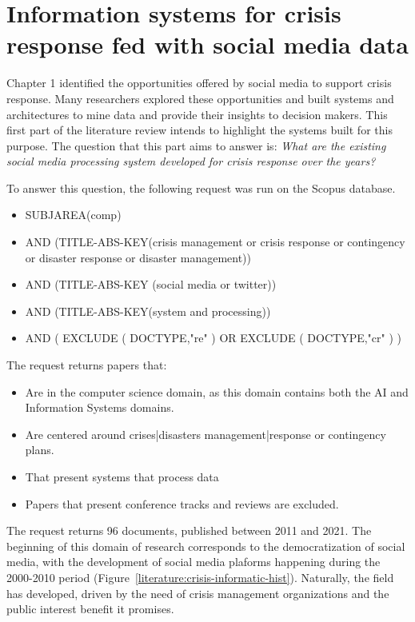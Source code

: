\section{Information systems for crisis response fed with social media data}
Chapter 1 identified the opportunities offered by social media to support crisis response.
Many researchers explored these opportunities and built systems and architectures to mine data and provide their insights to decision makers.
This first part of the literature review intends to highlight the systems built for this purpose.
The question that this part aims to answer is: \emph{What are the existing social media processing system developed for crisis response over the years?}

To answer this question, the following request was run on the Scopus database.

\begin{itemize}
    \item SUBJAREA(comp)
    \item AND (TITLE-ABS-KEY({crisis management} or {crisis response} or contingency or {disaster response} or {disaster management}))
    \item AND (TITLE-ABS-KEY ({social media} or twitter))
    \item AND (TITLE-ABS-KEY(system and processing))
    \item AND ( EXCLUDE ( DOCTYPE,"re" ) OR EXCLUDE ( DOCTYPE,"cr" ) )
\end{itemize}

The request returns papers that:

\begin{itemize}
    \item Are in the computer science domain, as this domain contains both the AI and Information Systems domains.
    \item Are centered around crises|disasters management|response or contingency plans.
    \item That present systems that process data
    \item Papers that present conference tracks and reviews are excluded.
\end{itemize}

The request returns 96 documents, published between 2011 and 2021.
The beginning of this domain of research corresponds to the democratization of social media, with the development of social media plaforms happening during the 2000-2010 period (Figure~\ref{literature:crisis-informatic-hist}).
Naturally, the field has developed, driven by the need of crisis management organizations and the public interest benefit it promises.

